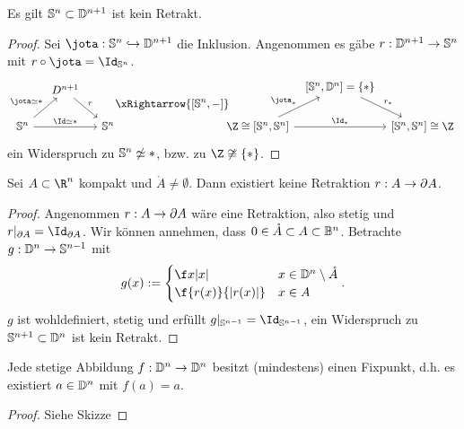 \begin{kor}
	Es gilt $\mathbb{S}^n \subset \mathbb{D}^{n+1}$ ist kein Retrakt.
	\begin{proof}
		Sei $\jota: \S^n \injto \D^{n+1}$ die Inklusion.
		Angenommen es gäbe $r: \mathbb{D}^{n+1} \to \mathbb{S}^n$ mit $r \circ \jota = \Id_{\S^n}$.
		\[
			\begin{tikzcd}[column sep=small]
				~& D^{n+1} \arrow{dr}{r} &\\
				\S^n \arrow{rr}{\Id \homotopic *}\arrow{ur}{\jota\homotopic *} & & \S^n
			\end{tikzcd}
			\!\!\xRightarrow{[\S^n, -]}\!\!\!\!
			\begin{tikzcd}[column sep=tiny]
				~& {[\S^n, \D^n] = \{*\}} \arrow{dr}{r_*} & \\
				{\Z \homeomorphic [\S^n, \S^n]} \arrow{ur}{\jota_*} \arrow{rr}{\Id_*} & & {[\S^n, \S^n] \homeomorphic \Z}
			\end{tikzcd}
		\]
		ein Widerspruch zu $\mathbb{S}^n \not\simeq *$, bzw. zu $\Z \not\homeomorphic \{*\}$.
	\end{proof}
\end{kor}

\begin{st}
	Sei $A \subset \R^n$ kompakt und $\mathring A \neq \emptyset$.
	Dann existiert keine Retraktion $r: A \to \partial A$.
	\begin{proof}
		Angenommen $r: A \to \partial A$ wäre eine Retraktion, also stetig und $r|_{\boundary A} = \Id_{\boundary A}$.
		Wir können \oBdA annehmen, dass $0 \in \mathring A \subset A \subset \mathbb{B}^n$.
		Betrachte $g: \mathbb{D}^n \to \mathbb{S}^{n-1}$ mit
		\[
			g(x) := \begin{cases}
				\f x{|x|} & x \in \D^n \setminus \mathring A \\
				\f {r(x)}{|r(x)|} & x \in A
			\end{cases}.
		\]
		$g$ ist wohldefiniert, stetig und erfüllt $g|_{\S^{n-1}} = \Id_{\S^{n-1}}$, ein Widerspruch zu $\mathbb{S}^{n+1} \subset \mathbb{D}^n$ ist kein Retrakt.
	\end{proof}
\end{st}

\begin{st}
	Jede stetige Abbildung $f: \mathbb{D}^n \to \mathbb{D}^n$ besitzt (mindestens) einen Fixpunkt, d.h. es existiert $a \in \mathbb{D}^n$ mit $f(a) = a$.
	\begin{proof}
		Siehe Skizze
	\end{proof}
\end{st}


